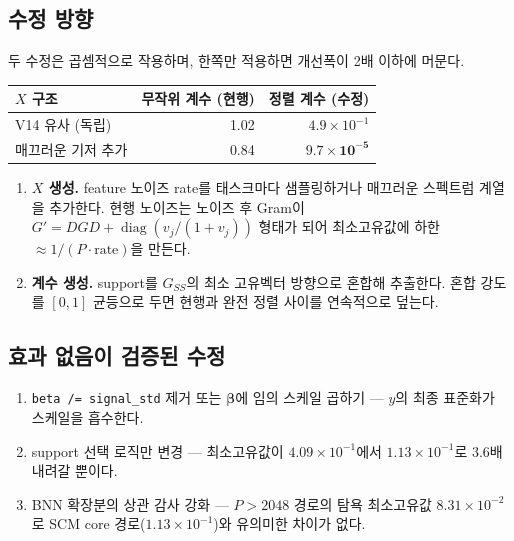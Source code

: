 \documentclass[11pt,a4paper]{article}
\theoremstyle{definition}
\newcommand{\bbeta}{\boldsymbol{\beta}}
\begin{document}
\subsection{수정 방향}

두 수정은 곱셈적으로 작용하며, 한쪽만 적용하면 개선폭이 2배 이하에 머문다.

\begin{center}
\begin{tabular}{@{}lrr@{}}
\toprule
\textbf{\(X\) 구조} & \textbf{무작위 계수 (현행)} & \textbf{정렬 계수 (수정)}\\
\midrule
V14 유사 (독립) & 1.02 & \(4.9\times10^{-1}\)\\
매끄러운 기저 추가 & 0.84 & \(\mathbf{9.7\times10^{-5}}\)\\
\bottomrule
\end{tabular}
\end{center}

\begin{enumerate}[leftmargin=2.2em,itemsep=0.35em]
\item \textbf{\(X\) 생성.} feature 노이즈 rate를 태스크마다 샘플링하거나 매끄러운 스펙트럼 계열을 추가한다. 현행 노이즈는 노이즈 후 Gram이 \(G'=DGD+\operatorname{diag}\!\left(v_j/(1+v_j)\right)\) 형태가 되어 최소고유값에 하한 \(\approx1/(P\cdot\text{rate})\)을 만든다.
\item \textbf{계수 생성.} support를 \(G_{SS}\)의 최소 고유벡터 방향으로 혼합해 추출한다. 혼합 강도를 \([0,1]\) 균등으로 두면 현행과 완전 정렬 사이를 연속적으로 덮는다.
\end{enumerate}

\subsection{효과 없음이 검증된 수정}

\begin{enumerate}[label=(\alph*),leftmargin=2.2em,itemsep=0.3em]
\item \verb|beta /= signal_std| 제거 또는 \(\bbeta\)에 임의 스케일 곱하기 --- \(y\)의 최종 표준화가 스케일을 흡수한다.
\item support 선택 로직만 변경 --- 최소고유값이 \(4.09\times10^{-1}\)에서 \(1.13\times10^{-1}\)로 3.6배 내려갈 뿐이다.
\item BNN 확장분의 상관 감사 강화 --- \(P>2048\) 경로의 탐욕 최소고유값 \(8.31\times10^{-2}\)로 SCM core 경로(\(1.13\times10^{-1}\))와 유의미한 차이가 없다.
\end{enumerate}
\end{document}
